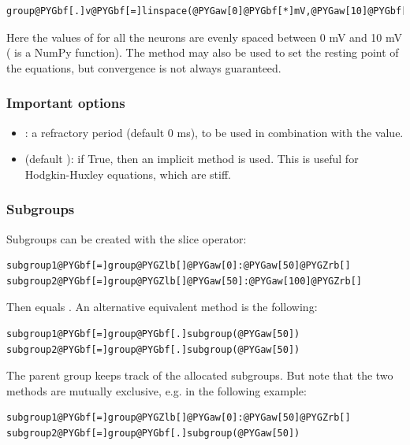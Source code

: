 \documentclass[letterpaper,10pt,english]{manual}
\begin{document}
\begin{Verbatim}[commandchars=@\[\]]
group@PYGbf[.]v@PYGbf[=]linspace(@PYGaw[0]@PYGbf[*]mV,@PYGaw[10]@PYGbf[*]mV,@PYGaw[100])
\end{Verbatim}

Here the values of  for all the neurons are evenly spaced between 0 mV and 10 mV
( is a NumPy function). The method  may also be used to set the
resting point of the equations, but convergence is not always guaranteed.


\subsubsection{Important options}
\begin{itemize}
\item {} 
: a refractory period (default 0 ms), to be used in combination with the  value.

\item {} 
 (default ): if True, then an implicit method is used. This is useful
for Hodgkin-Huxley equations, which are stiff.

\end{itemize}


\subsubsection{Subgroups}

Subgroups can be created with the slice operator:

\begin{Verbatim}[commandchars=@\[\]]
subgroup1@PYGbf[=]group@PYGZlb[]@PYGaw[0]:@PYGaw[50]@PYGZrb[]
subgroup2@PYGbf[=]group@PYGZlb[]@PYGaw[50]:@PYGaw[100]@PYGZrb[]
\end{Verbatim}

Then  equals .
An alternative equivalent method is the following:

\begin{Verbatim}[commandchars=@\[\]]
subgroup1@PYGbf[=]group@PYGbf[.]subgroup(@PYGaw[50])
subgroup2@PYGbf[=]group@PYGbf[.]subgroup(@PYGaw[50])
\end{Verbatim}

The parent group keeps track of the allocated subgroups. But note that the two methods are
mutually exclusive, e.g. in the following example:

\begin{Verbatim}[commandchars=@\[\]]
subgroup1@PYGbf[=]group@PYGZlb[]@PYGaw[0]:@PYGaw[50]@PYGZrb[]
subgroup2@PYGbf[=]group@PYGbf[.]subgroup(@PYGaw[50])
\end{Verbatim}
\end{document}
